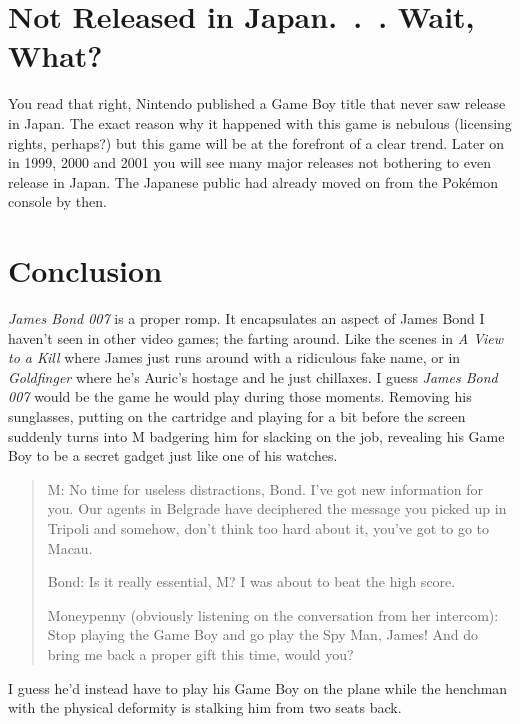 \documentclass{book}
\begin{document}
\FloatBarrier\needspace{5pt}\section*{Not Released in Japan. . . Wait, What?}\nopagebreak[4]

You read that right, Nintendo published a Game Boy title that never saw release in Japan. The exact reason why it happened with this game is nebulous (licensing rights, perhaps?) but this game will be at the forefront of a clear trend. Later on in 1999, 2000 and 2001 you will see many major releases not bothering to even release in Japan. The Japanese public had already moved on from the Pokémon console by then.

\FloatBarrier\needspace{5pt}\section*{Conclusion}\nopagebreak[4]

\emph{James Bond 007} is a proper romp. It encapsulates an aspect of James Bond I haven’t seen in other video games; the farting around. Like the scenes in \emph{A View to a Kill} where James just runs around with a ridiculous fake name, or in \emph{Goldfinger} where he’s Auric’s hostage and he just chillaxes. I guess \emph{James Bond 007} would be the game he would play during those moments. Removing his sunglasses, putting on the cartridge and playing for a bit before the screen suddenly turns into M badgering him for slacking on the job, revealing his Game Boy to be a secret gadget just like one of his watches.

\begin{quote}
M: No time for useless distractions, Bond. I’ve got new information for you. Our agents in Belgrade have deciphered the message you picked up in Tripoli and somehow, don’t think too hard about it, you’ve got to go to Macau.

Bond: Is it really essential, M? I was about to beat the high score.

Moneypenny (obviously listening on the conversation from her intercom): Stop playing the Game Boy and go play the Spy Man, James! And do bring me back a proper gift this time, would you?
\end{quote} \par

I guess he’d instead have to play his Game Boy on the plane while the henchman with the physical deformity is stalking him from two seats back.
\end{document}

